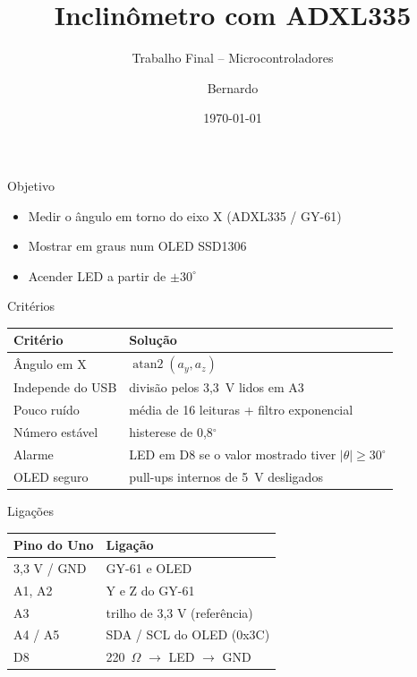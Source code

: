 \documentclass[aspectratio=169]{beamer}
\title{Inclinômetro com ADXL335}
\subtitle{Trabalho Final -- Microcontroladores}
\author{Bernardo}
\date{\today}
\begin{document}
\maketitle

\begin{frame}{Objetivo}
\begin{itemize}
  \item Medir o ângulo em torno do eixo X (ADXL335 / GY-61)
  \item Mostrar em graus num OLED SSD1306
  \item Acender LED a partir de $\pm30^\circ$
\end{itemize}
\end{frame}

\begin{frame}{Critérios}
\small
\begin{tabular}{ll}
\toprule
Critério & Solução \\
\midrule
Ângulo em X & $\operatorname{atan2}(a_y, a_z)$ \\
Independe do USB & divisão pelos 3,3~V lidos em A3 \\
Pouco ruído & média de 16 leituras + filtro exponencial \\
Número estável & histerese de 0,8$^\circ$ \\
Alarme & LED em D8 se o valor mostrado tiver $|\theta|\ge30^\circ$ \\
OLED seguro & pull-ups internos de 5~V desligados \\
\bottomrule
\end{tabular}
\end{frame}

\begin{frame}{Ligações}
\begin{tabular}{ll}
\toprule
Pino do Uno & Ligação \\
\midrule
3,3 V / GND & GY-61 e OLED \\
A1, A2 & Y e Z do GY-61 \\
A3 & trilho de 3,3 V (referência) \\
A4 / A5 & SDA / SCL do OLED (0x3C) \\
D8 & 220~$\Omega$ $\rightarrow$ LED $\rightarrow$ GND \\
\bottomrule
\end{tabular}
\end{frame}
\end{document}
